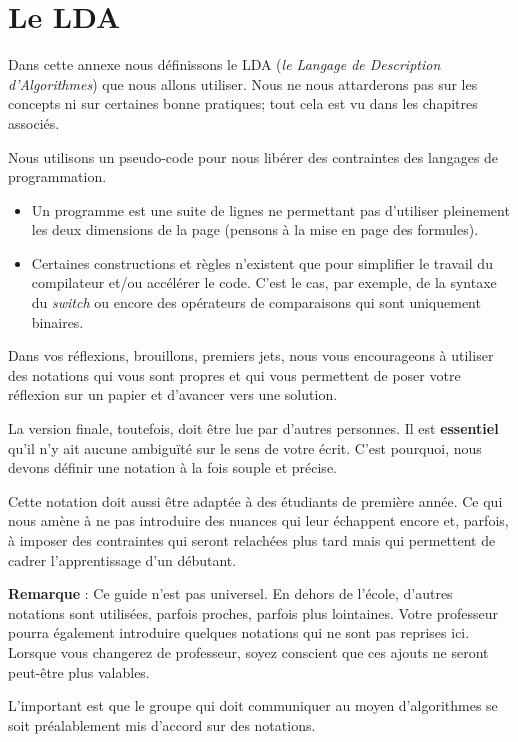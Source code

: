 \chapter{Le LDA}

Dans cette annexe nous définissons le LDA
(\emph{le Langage de Description d'Algorithmes})
que nous allons utiliser. 
Nous ne nous attarderons pas sur les concepts
ni sur certaines bonne pratiques;
tout cela est vu dans les chapitres associés.

Nous utilisons un pseudo-code pour nous libérer 
des contraintes des langages de programmation.
\begin{itemize}
\item
	Un programme est une suite de lignes
	ne permettant pas d'utiliser pleinement les
	deux dimensions de la page 
	(pensons à la mise en page des formules).
\item
	Certaines constructions et règles
	n'existent que pour simplifier le travail du compilateur
	et/ou accélérer le code.
	C'est le cas, par exemple, de la syntaxe du \emph{switch}
	ou encore des opérateurs de comparaisons qui sont uniquement
	binaires.
\end{itemize}

Dans vos réflexions, brouillons, premiers jets,
nous vous encourageons à utiliser des notations
qui vous sont propres et qui vous permettent
de poser votre réflexion sur un papier
et d'avancer vers une solution.

La version finale, toutefois, 
doit être lue par d'autres personnes.
Il est \textbf{essentiel} qu'il n'y ait aucune ambiguïté
sur le sens de votre écrit.
C'est pourquoi, nous devons définir une notation
à la fois souple et précise.

Cette notation doit aussi être adaptée à des étudiants de première année.
Ce qui nous amène à ne pas introduire des nuances qui leur échappent encore
et, parfois, à imposer des contraintes qui seront relachées plus tard
mais qui permettent de cadrer l'apprentissage d'un débutant.

\textbf{Remarque} : Ce guide n'est pas universel.
En dehors de l'école, d'autres notations sont utilisées,
parfois proches, parfois plus lointaines.
Votre professeur pourra également introduire quelques notations
qui ne sont pas reprises ici. 
Lorsque vous changerez de professeur,
soyez conscient que ces ajouts ne seront peut-être plus valables.

L'important est que le groupe qui doit communiquer
au moyen d'algorithmes se soit préalablement mis d'accord 
sur des notations.

